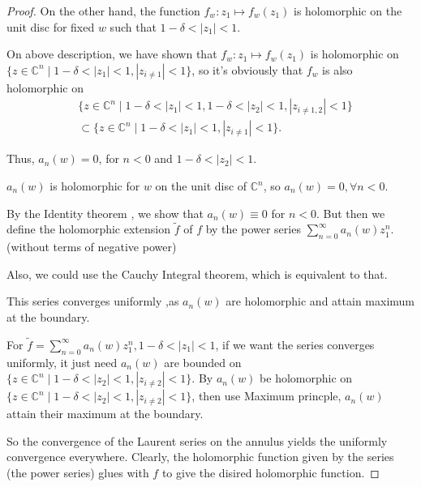 \begin{proof}
    On the other hand, the function $f_w\colon z_1\mapsto f_w(z_1)$ is holomorphic on the unit disc for fixed $w$ such that $1-\delta<|z_1|<1$. 
    \begin{remark}
        On above description, we have shown that $f_w\colon z_1\mapsto f_w(z_1)$ is holomorphic on $\{z\in\mathbb{C}^n\mid 1-\delta<|z_1|<1,|z_{i\neq 1}|<1\}$, so it's obviously that $f_w$ is also holomorphic on 
        \begin{align*}
        &\{z\in\mathbb{C}^n\mid 1-\delta<|z_1|<1,1-\delta<|z_2|<1,|z_{i\neq 1,2}|<1\}\\
        &\subset \{z\in\mathbb{C}^n\mid 1-\delta<|z_1|<1,|z_{i\neq 1}|<1\}.
        \end{align*}
    \end{remark}
    Thus, $a_n (w)=0$, for $n<0$ and $1-\delta<|z_2|<1$. 
    \begin{remark}
        $a_n(w)$ is holomorphic for $w$ on the unit disc of $\mathbb{C}^n$, so $a_n (w)=0, \forall n<0$. 
    \end{remark}
    By the Identity theorem , we show that $a_n(w)\equiv 0$ for $n<0$. But then we define the holomorphic extension $\widetilde{f}$ of $f$ by the power series $\sum_{n=0}^{\infty}a_n (w)z_1^n$. (without terms of negative power)
    \begin{remark}
        Also, we could use the Cauchy Integral theorem, which is equivalent to that.
    \end{remark}
    This series converges uniformly ,as $a_n (w)$ are holomorphic and attain maximum at the boundary. 
    \begin{remark}
        For $\widetilde{f}=\sum_{n=0}^{\infty}a_n(w)z_1^n, 1-\delta<|z_1|<1$, if we want the series converges uniformly, it just need $a_n(w)$ are bounded on $\{z\in\mathbb{C}^n\mid 1-\delta<|z_2|<1,|z_{i\neq 2}|<1\}$. By $a_n(w)$ be holomorphic on $\{z\in\mathbb{C}^n\mid 1-\delta<|z_2|<1,|z_{i\neq 2}|<1\}$, then use Maximum princple, $a_n(w)$ attain their maximum at the boundary.
        \end{remark}
        So the convergence of the Laurent series on the annulus yields the uniformly convergence everywhere. Clearly, the holomorphic function given by the series (the power series) glues with $f$ to give the disired holomorphic function.
\end{proof}















